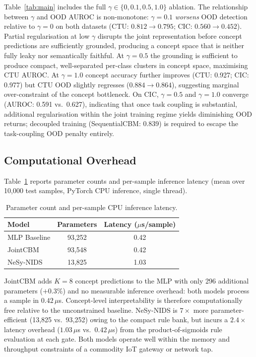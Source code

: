 \documentclass[conference]{IEEEtran}
\begin{document}
Table~\ref{tab:main} includes the full $\gamma \in \{0, 0.1, 0.5, 1.0\}$
ablation. The relationship between $\gamma$ and OOD AUROC is
non-monotone: $\gamma{=}0.1$ \emph{worsens} OOD detection relative to
$\gamma{=}0$ on both datasets (CTU: $0.812\to0.795$; CIC:
$0.560\to0.452$). Partial regularisation at low $\gamma$ disrupts the
joint representation before concept predictions are sufficiently
grounded, producing a concept space that is neither fully leaky nor
semantically faithful. At $\gamma{=}0.5$ the grounding is sufficient to
produce compact, well-separated per-class clusters in concept space,
maximising CTU AUROC. At $\gamma{=}1.0$ concept accuracy further
improves (CTU: 0.927; CIC: 0.977) but CTU OOD slightly regresses
($0.884\to0.864$), suggesting marginal over-constraint of the concept
bottleneck. On CIC, $\gamma{=}0.5$ and $\gamma{=}1.0$ converge
(AUROC: 0.591 vs.\ 0.627), indicating that once task coupling is
substantial, additional regularisation within the joint training
regime yields diminishing OOD returns; decoupled training
(SequentialCBM: 0.839) is required to escape the task-coupling OOD
penalty entirely.

\subsection{Computational Overhead}
\label{sec:compute}

Table~\ref{tab:compute} reports parameter counts and per-sample
inference latency (mean over 10{,}000 test samples, PyTorch CPU
inference, single thread).

\begin{table}[!h]
\renewcommand{\arraystretch}{1.1}
\caption{Parameter count and per-sample CPU inference latency.}
\label{tab:compute}
\centering
\small
\begin{tabular}{lcc}
\toprule
\textbf{Model} & \textbf{Parameters} & \textbf{Latency ($\mu$s/sample)} \\
\midrule
MLP Baseline & 93{,}252 & 0.42 \\
JointCBM     & 93{,}548 & 0.42 \\
NeSy-NIDS    & 13{,}825 & 1.03 \\
\bottomrule
\end{tabular}
\end{table}

JointCBM adds $K{=}8$ concept predictions to the MLP with only 296
additional parameters ($+0.3\%$) and no measurable inference overhead:
both models process a sample in $0.42\,\mu$s. Concept-level
interpretability is therefore computationally free relative to the
unconstrained baseline. NeSy-NIDS is $7{\times}$ more
parameter-efficient (13{,}825 vs.\ 93{,}252) owing to the compact rule
bank, but incurs a $2.4{\times}$ latency overhead ($1.03\,\mu$s
vs.\ $0.42\,\mu$s) from the product-of-sigmoids rule evaluation at each
gate. Both models operate well within the memory and throughput
constraints of a commodity IoT gateway or network tap.
\end{document}
